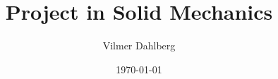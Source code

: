 \usepackage[utf8]{inputenc}
\usepackage{mwe}
\usepackage{float}

\usepackage{mathtools}
\usepackage{amsfonts}

\usepackage{graphicx}
\usepackage{fancyhdr, tikz}
\usepackage{bm}
\usepackage[justification=centering]{caption}
\usepackage[position=bottom]{subfig}

\usepackage{geometry}
\geometry{top=20mm}
\geometry{bottom=20mm}

\usepackage{hyperref}
\usepackage[toc,page]{appendix}
\usepackage{lipsum}
\usepackage{titlesec}
\usepackage{caption}
\usepackage{scrextend}
\usepackage{framed}
\captionsetup{compatibility=false}

\title{Project in Solid Mechanics}
\author{Vilmer Dahlberg}
\date{\today}
